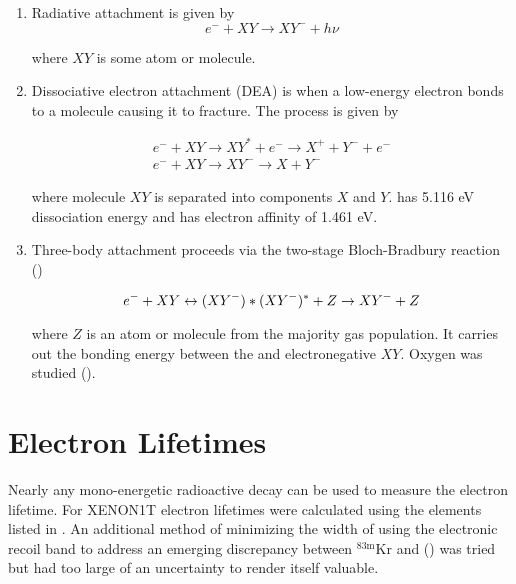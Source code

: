 \begin{enumerate}
\item Radiative attachment is given by
\begin{equation}
e^- + XY \rightarrow XY^- + h \nu
\end{equation}

\noindent where $XY$ is some atom or molecule.

\item Dissociative electron attachment (DEA) is when a low-energy electron bonds to a molecule causing it to fracture.  The process
is given by

\begin{equation}
\begin{aligned}
e^- + XY \rightarrow XY^* + e^- \rightarrow X^+ + Y^- + e^- \\
e^- + XY \rightarrow XY^- \rightarrow X + Y^-
\end{aligned}
\end{equation}

\noindent where molecule $XY$ is separated into components $X$ and $Y$.   has 5.116 eV dissociation energy and  has
electron affinity of 1.461 eV.

\item Three-body attachment proceeds via the two-stage Bloch-Bradbury reaction ()

\begin{equation}
e^- + XY \leftrightarrow (XY^-)* \\
(XY^-)^* + Z \rightarrow XY^- + Z
\end{equation}

\noindent where $Z$ is an atom or molecule from the majority gas population.  It carries out the bonding energy between the
\electron and electronegative $XY$.  Oxygen was studied ().
\end{enumerate}



\section{Electron Lifetimes}
\label{sec:electron_lifetimes}
Nearly any mono-energetic radioactive decay can be used to measure the electron lifetime.  For XENON1T electron lifetimes were calculated
using the elements listed in .  An additional method of minimizing the width of \cstwob using the
 electronic recoil band to address an emerging discrepancy between
$\mathrm{^{83m}Kr}$ and \alphadecays () was tried but had too large of an uncertainty
to render itself valuable.


